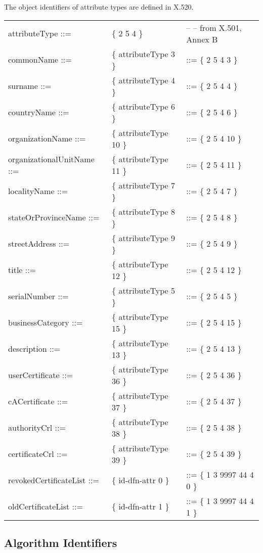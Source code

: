 The object identifiers of attribute types are defined
in X.520.
{\small
\begin {center}
\begin {tabular}{lll}
attributeType ::=          & \{ 2 5 4 \} & -- -- from X.501, Annex B \\
commonName ::=             & \{ attributeType 3 \}  & ::= \{ 2 5 4 3 \}  \\
surname ::=                & \{ attributeType 4 \}  & ::= \{ 2 5 4 4 \}  \\
countryName ::=            & \{ attributeType 6 \}  & ::= \{ 2 5 4 6 \}  \\
organizationName ::=       & \{ attributeType 10 \} & ::= \{ 2 5 4 10 \} \\
organizationalUnitName ::= & \{ attributeType 11 \} & ::= \{ 2 5 4 11 \} \\
localityName ::=           & \{ attributeType 7 \}  & ::= \{ 2 5 4 7 \}  \\
stateOrProvinceName ::=    & \{ attributeType 8 \}  & ::= \{ 2 5 4 8 \}  \\
streetAddress ::=          & \{ attributeType 9 \}  & ::= \{ 2 5 4 9 \}  \\
title ::=                  & \{ attributeType 12 \} & ::= \{ 2 5 4 12 \}  \\
serialNumber ::=           & \{ attributeType 5 \}  & ::= \{ 2 5 4 5 \}  \\
businessCategory ::=       & \{ attributeType 15 \} & ::= \{ 2 5 4 15 \}  \\
description      ::=       & \{ attributeType 13 \} & ::= \{ 2 5 4 13 \}  \\
userCertificate ::=        & \{ attributeType 36 \} & ::= \{ 2 5 4 36 \} \\
cACertificate ::=          & \{ attributeType 37 \} & ::= \{ 2 5 4 37 \} \\
authorityCrl ::=   & \{ attributeType 38 \} & ::= \{ 2 5 4 38 \} \\
certificateCrl ::= & \{ attributeType 39 \} & ::= \{ 2 5 4 39 \} \\
revokedCertificateList ::= & \{ id-dfn-attr 0 \} & ::= \{ 1 3 9997 44 4 0 \} \\
oldCertificateList ::=     & \{ id-dfn-attr 1 \} & ::= \{ 1 3 9997 44 4 1 \}
\end {tabular}
\end {center}
}

\subsection{Algorithm Identifiers}
\label{asn1-algid}
 
